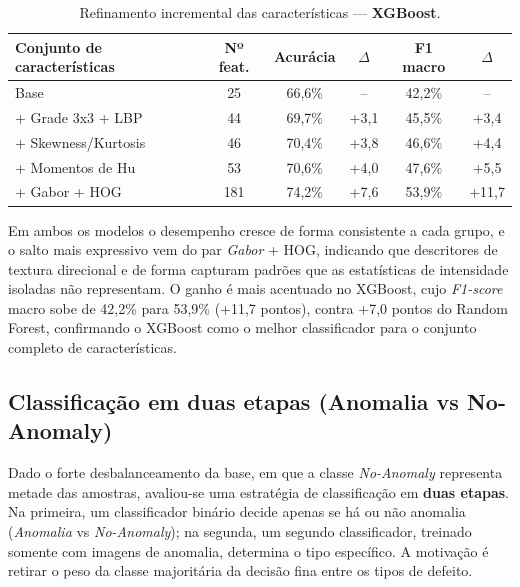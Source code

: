 \documentclass[a4paper,11pt]{article}
\begin{document}
\begin{table}[H]
	\centering
	\caption{Refinamento incremental das características --- \textbf{XGBoost}.}
	\label{tab:incremental_xgb}
	\vspace{0.2cm}
	\renewcommand{\arraystretch}{1.2}
	\begin{tabular}{l c c c c c}
		\hline
		\textbf{Conjunto de características} & \textbf{Nº feat.} & \textbf{Acurácia} & \textbf{$\Delta$} & \textbf{F1 macro} & \textbf{$\Delta$} \\
		\hline
		Base                 & 25  & 66,6\% & --     & 42,2\% & --     \\ \hline
		+ Grade 3x3 + LBP    & 44  & 69,7\% & +3,1   & 45,5\% & +3,4   \\ \hline
		+ Skewness/Kurtosis  & 46  & 70,4\% & +3,8   & 46,6\% & +4,4   \\ \hline
		+ Momentos de Hu     & 53  & 70,6\% & +4,0   & 47,6\% & +5,5   \\ \hline
		+ Gabor + HOG        & 181 & 74,2\% & +7,6   & 53,9\% & +11,7  \\
		\hline
	\end{tabular}
\end{table}

Em ambos os modelos o desempenho cresce de forma consistente a cada grupo, e o salto mais expressivo vem do par \textit{Gabor} + HOG, indicando que descritores de textura direcional e de forma capturam padrões que as estatísticas de intensidade isoladas não representam. O ganho é mais acentuado no XGBoost, cujo \textit{F1-score} macro sobe de 42,2\% para 53,9\% (+11,7 pontos), contra +7,0 pontos do Random Forest, confirmando o XGBoost como o melhor classificador para o conjunto completo de características.

\subsection{Classificação em duas etapas (Anomalia vs No-Anomaly)}

Dado o forte desbalanceamento da base, em que a classe \textit{No-Anomaly} representa metade das amostras, avaliou-se uma estratégia de classificação em \textbf{duas etapas}. Na primeira, um classificador binário decide apenas se há ou não anomalia (\textit{Anomalia} vs \textit{No-Anomaly}); na segunda, um segundo classificador, treinado somente com imagens de anomalia, determina o tipo específico. A motivação é retirar o peso da classe majoritária da decisão fina entre os tipos de defeito.
\end{document}
